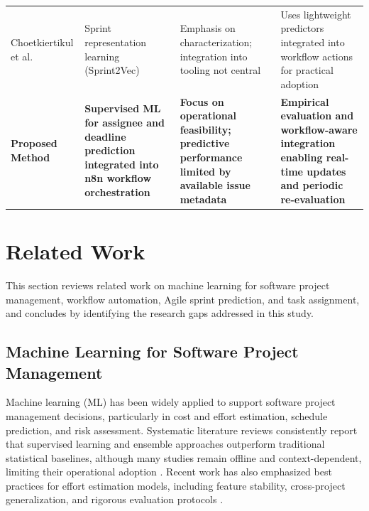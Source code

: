 \documentclass[conference]{IEEEtran}
\begin{document}
\begin{table}[t]
\begin{tabular}{p{3.2cm} p{4.0cm} p{4.5cm} p{5.0cm}}
Choetkiertikul et al. \cite{choetkiertikul2025_sprint2vec} &
Sprint representation learning (Sprint2Vec) &
Emphasis on characterization; integration into tooling not central &
Uses lightweight predictors integrated into workflow actions for practical adoption \\

\textbf{Proposed Method} &
\textbf{Supervised ML for assignee and deadline prediction integrated into n8n workflow orchestration} &
\textbf{Focus on operational feasibility; predictive performance limited by available issue metadata} &
\textbf{Empirical evaluation and workflow-aware integration enabling real-time updates and periodic re-evaluation} \\

\hline
\end{tabular}
\label{table:gap}
\end{table}

\section{Related Work}

This section reviews related work on machine learning for software project management, workflow automation, Agile sprint prediction, and task assignment, and concludes by identifying the research gaps addressed in this study.

\subsection{Machine Learning for Software Project Management}

Machine learning (ML) has been widely applied to support software project management decisions, particularly in cost and effort estimation, schedule prediction, and risk assessment. Systematic literature reviews consistently report that supervised learning and ensemble approaches outperform traditional statistical baselines, although many studies remain offline and context-dependent, limiting their operational adoption \cite{shamim2025_costreview, mahdi2021_spm_slr}. Recent work has also emphasized best practices for effort estimation models, including feature stability, cross-project generalization, and rigorous evaluation protocols \cite{brar2022_effort_slr, cabral2023_ensemble_effort}.
\end{document}
